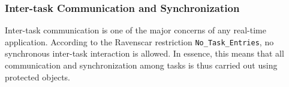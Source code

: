 \subsubsection{Inter-task Communication and Synchronization}
\label{sec:comm_sync}
Inter-task communication is one of the major concerns of any real-time
application. According to the Ravenscar restriction
\texttt{No\_Task\_Entries}, no synchronous inter-task interaction is
allowed. In essence, this means that all communication and
synchronization among tasks is thus carried out using protected
objects.

